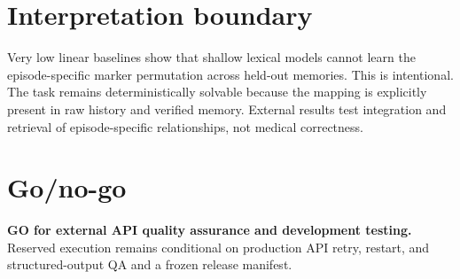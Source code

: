 \documentclass[10.5pt]{article}\usepackage[margin=.82in]{geometry}\usepackage[T1]{fontenc}\usepackage{lmodern,microtype,booktabs,longtable,amsmath,xcolor,hyperref,fancyhdr}
\begin{document}
\section{Interpretation boundary}Very low linear baselines show that shallow lexical models cannot learn the episode-specific marker permutation across held-out memories. This is intentional. The task remains deterministically solvable because the mapping is explicitly present in raw history and verified memory. External results test integration and retrieval of episode-specific relationships, not medical correctness.
\section{Go/no-go}\noindent\colorbox{good}{\parbox{.96\linewidth}{\textbf{GO for external API quality assurance and development testing.} Reserved execution remains conditional on production API retry, restart, and structured-output QA and a frozen release manifest.}}
\end{document}
